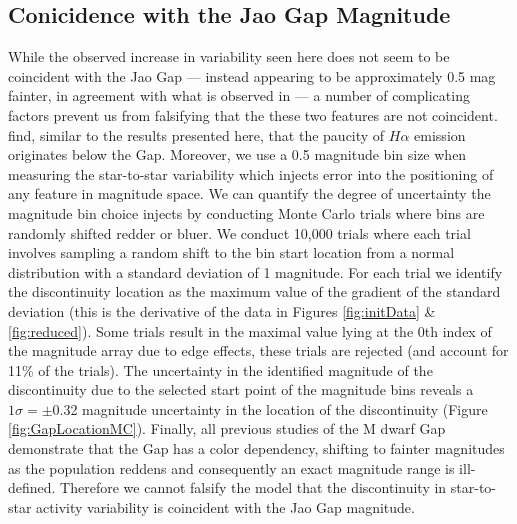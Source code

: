 \subsection{Conicidence with the Jao Gap Magnitude}\label{sec:coincident}
While the observed increase in variability seen here does not seem to be
coincident with the Jao Gap --- instead appearing to be approximately 0.5 mag
fainter, in agreement with what is observed in \citet{Jao2023} --- a number of
complicating factors prevent us from falsifying that the these two features are
not coincident. \citeauthor{Jao2023} find, similar to the results presented
here, that the paucity of $H\alpha$ emission originates below the Gap.
Moreover, we use a 0.5 magnitude bin size when measuring the star-to-star
variability which injects error into the positioning of any feature in
magnitude space. We can quantify the degree of uncertainty the magnitude bin
choice injects by conducting Monte Carlo trials where bins are randomly shifted
redder or bluer. We conduct 10,000 trials where each trial involves sampling a
random shift to the bin start location from a normal distribution with a
standard deviation of 1 magnitude. For each trial we identify the discontinuity
location as the maximum value of the gradient of the standard deviation (this
is the derivative of the data in Figures \ref{fig:initData} \&
\ref{fig:reduced}). Some trials result in the maximal value lying at the 0th
index of the magnitude array due to edge effects, these trials are rejected
(and account for 11\% of the trials). The uncertainty in the identified
magnitude of the discontinuity due to the selected start point of the magnitude
bins reveals a $1\sigma = \pm$0.32 magnitude uncertainty in the location of the
discontinuity (Figure \ref{fig:GapLocationMC}). Finally, all previous studies
of the M dwarf Gap \citep{Jao2018, Jao2021, Mansfield2021, Boudreaux2022,
Jao2023} demonstrate that the Gap has a color dependency, shifting to fainter
magnitudes as the population reddens and consequently an exact magnitude range
is ill-defined. Therefore we cannot falsify the model that the discontinuity in
star-to-star activity variability is coincident with the Jao Gap magnitude.

